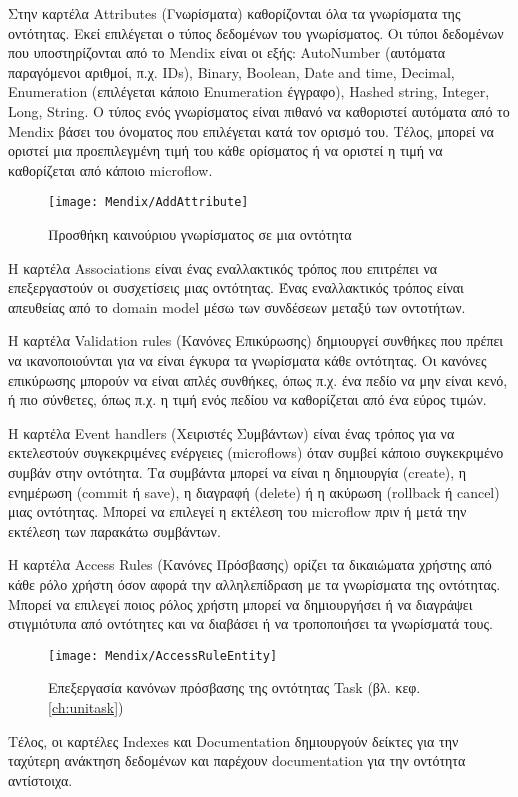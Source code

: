                 Στην καρτέλα Attributes (Γνωρίσματα) καθορίζονται όλα τα γνωρίσματα της οντότητας. Εκεί επιλέγεται ο τύπος δεδομένων του γνωρίσματος. Οι τύποι δεδομένων που υποστηρίζονται από το Mendix είναι οι εξής: AutoNumber (αυτόματα παραγόμενοι αριθμοί, π.χ. IDs), Binary, Boolean, Date and time, Decimal, Enumeration (επιλέγεται κάποιο Enumeration έγγραφο), Hashed string, Integer, Long, String. Ο τύπος ενός γνωρίσματος είναι πιθανό να καθοριστεί αυτόματα από το Mendix βάσει του όνοματος που επιλέγεται κατά τον ορισμό του. Τέλος, μπορεί να οριστεί μια προεπιλεγμένη τιμή του κάθε ορίσματος ή να οριστεί η τιμή να καθορίζεται από κάποιο microflow.

                \begin{figure}[h!] \noindent \centering
                        \texttt{[image: Mendix/AddAttribute]}
                        \caption{\centering Προσθήκη καινούριου γνωρίσματος σε μια οντότητα}
                \end{figure}

                Η καρτέλα Associations είναι ένας εναλλακτικός τρόπος που επιτρέπει να επεξεργαστούν οι συσχετίσεις μιας οντότητας. Ένας εναλλακτικός τρόπος είναι απευθείας από το domain model μέσω των συνδέσεων μεταξύ των οντοτήτων.

                Η καρτέλα Validation rules (Κανόνες Επικύρωσης) δημιουργεί συνθήκες που πρέπει να ικανοποιούνται για να είναι έγκυρα τα γνωρίσματα κάθε οντότητας. Οι κανόνες επικύρωσης μπορούν να είναι απλές συνθήκες, όπως π.χ. ένα πεδίο να μην είναι κενό, ή πιο σύνθετες, όπως π.χ. η τιμή ενός πεδίου να καθορίζεται από ένα εύρος τιμών.

                Η καρτέλα Event handlers (Χειριστές Συμβάντων) είναι ένας τρόπος για να εκτελεστούν συγκεκριμένες ενέργειες (microflows) όταν συμβεί κάποιο συγκεκριμένο συμβάν στην οντότητα. Τα συμβάντα μπορεί να είναι η δημιουργία (create), η ενημέρωση (commit ή save), η διαγραφή (delete) ή η ακύρωση (rollback ή cancel) μιας οντότητας. Μπορεί να επιλεγεί η εκτέλεση του microflow πριν ή μετά την εκτέλεση των παρακάτω συμβάντων.

                Η καρτέλα Access Rules (Κανόνες Πρόσβασης) ορίζει τα δικαιώματα χρήστης από κάθε ρόλο χρήστη όσον αφορά την αλληλεπίδραση με τα γνωρίσματα της οντότητας. Μπορεί να επιλεγεί ποιος ρόλος χρήστη μπορεί να δημιουργήσει ή να διαγράψει στιγμιότυπα από οντότητες και να διαβάσει ή να τροποποιήσει τα γνωρίσματά τους.

                \begin{figure}[h!] \noindent \centering
                        \texttt{[image: Mendix/AccessRuleEntity]}
                        \caption{\centering Επεξεργασία κανόνων πρόσβασης της οντότητας Task (βλ. κεφ. \ref{ch:unitask})}
                \end{figure}

                Τέλος, οι καρτέλες Indexes και Documentation δημιουργούν δείκτες για την ταχύτερη ανάκτηση δεδομένων και παρέχουν documentation για την οντότητα αντίστοιχα.


